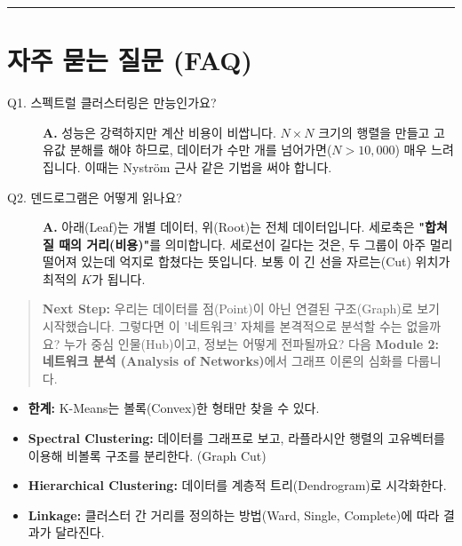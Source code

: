 \documentclass[11pt,a4paper]{book}
\theoremstyle{definition}
\begin{document}
\vspace{0.5cm}\hrule\vspace{0.5cm}

\section{자주 묻는 질문 (FAQ)}

\begin{description}
    \item[Q1. 스펙트럴 클러스터링은 만능인가요?]
    \textbf{A.} 성능은 강력하지만 계산 비용이 비쌉니다. $N \times N$ 크기의 행렬을 만들고 고유값 분해를 해야 하므로, 데이터가 수만 개를 넘어가면($N > 10,000$) 매우 느려집니다. 이때는 Nyström 근사 같은 기법을 써야 합니다.
    
    \item[Q2. 덴드로그램은 어떻게 읽나요?]
    \textbf{A.} 아래(Leaf)는 개별 데이터, 위(Root)는 전체 데이터입니다. 세로축은 \textbf{"합쳐질 때의 거리(비용)"}를 의미합니다. 세로선이 길다는 것은, 두 그룹이 아주 멀리 떨어져 있는데 억지로 합쳤다는 뜻입니다. 보통 이 긴 선을 자르는(Cut) 위치가 최적의 $K$가 됩니다.
\end{description}

\vspace{1cm}
\begin{quote}
\textbf{Next Step:} 우리는 데이터를 점(Point)이 아닌 연결된 구조(Graph)로 보기 시작했습니다. 그렇다면 이 '네트워크' 자체를 본격적으로 분석할 수는 없을까요? 누가 중심 인물(Hub)이고, 정보는 어떻게 전파될까요? 다음 \textbf{Module 2: 네트워크 분석 (Analysis of Networks)}에서 그래프 이론의 심화를 다룹니다.
\end{quote}

\begin{summarybox}[title={Module 1 (Part B) 핵심 요약}]
\begin{itemize}
    \item \textbf{한계:} K-Means는 볼록(Convex)한 형태만 찾을 수 있다.
    \item \textbf{Spectral Clustering:} 데이터를 그래프로 보고, 라플라시안 행렬의 고유벡터를 이용해 비볼록 구조를 분리한다. (Graph Cut)
    \item \textbf{Hierarchical Clustering:} 데이터를 계층적 트리(Dendrogram)로 시각화한다.
    \item \textbf{Linkage:} 클러스터 간 거리를 정의하는 방법(Ward, Single, Complete)에 따라 결과가 달라진다.
\end{itemize}
\end{summarybox}
\end{document}
